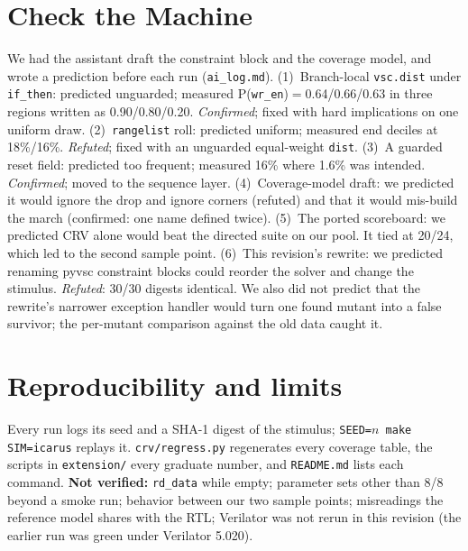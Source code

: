 \documentclass[10pt]{article}
\newcommand{\code}[1]{\texttt{#1}}
\begin{document}
\section{Check the Machine}\label{sec:ctm}
We had the assistant draft the constraint block and the coverage model, and wrote a prediction before each run (\code{ai\_log.md}). (1)~Branch-local \code{vsc.dist} under \code{if\_then}: predicted unguarded; measured P(\code{wr\_en})$=$0.64/0.66/0.63 in three regions written as 0.90/0.80/0.20. \emph{Confirmed}; fixed with hard implications on one uniform draw. (2)~\code{rangelist} roll: predicted uniform; measured end deciles at 18\%/16\%. \emph{Refuted}; fixed with an unguarded equal-weight \code{dist}. (3)~A guarded reset field: predicted too frequent; measured 16\% where 1.6\% was intended. \emph{Confirmed}; moved to the sequence layer. (4)~Coverage-model draft: we predicted it would ignore the drop and ignore corners (refuted) and that it would mis-build the march (confirmed: one name defined twice). (5)~The ported scoreboard: we predicted CRV alone would beat the directed suite on our pool. It tied at 20/24, which led to the second sample point. (6)~This revision's rewrite: we predicted renaming pyvsc constraint blocks could reorder the solver and change the stimulus. \emph{Refuted}: 30/30 digests identical. We also did not predict that the rewrite's narrower exception handler would turn one found mutant into a false survivor; the per-mutant comparison against the old data caught it.

\section{Reproducibility and limits}
Every run logs its seed and a SHA-1 digest of the stimulus; \code{SEED=$n$ make SIM=icarus} replays it. \code{crv/regress.py} regenerates every coverage table, the scripts in \code{extension/} every graduate number, and \code{README.md} lists each command. \textbf{Not verified:} \code{rd\_data} while empty; parameter sets other than 8/8 beyond a smoke run; behavior between our two sample points; misreadings the reference model shares with the RTL; Verilator was not rerun in this revision (the earlier run was green under Verilator 5.020).
\end{document}
